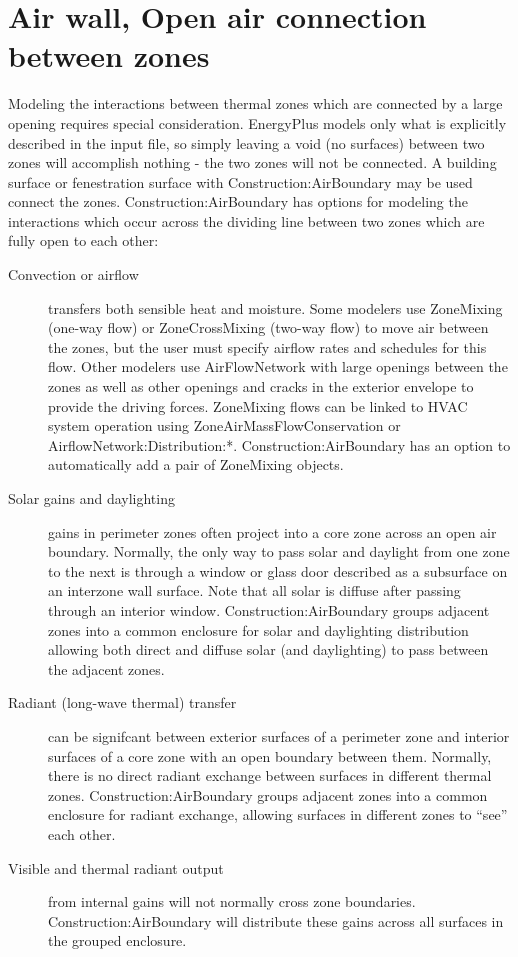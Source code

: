\section{Air wall, Open air connection between zones}\label{air-wall-open-air-connection-between-zones}

Modeling the interactions between thermal zones which are connected by a large opening requires special consideration. EnergyPlus models only what is explicitly described in the input file, so simply leaving a void (no surfaces) between two zones will accomplish nothing - the two zones will not be connected. A building surface or fenestration surface with Construction:AirBoundary may be used connect the zones. Construction:AirBoundary has options for modeling the interactions which occur across the dividing line between two zones which are fully open to each other:

\begin{description}
  \item[Convection or airflow] transfers both sensible heat and moisture. Some modelers use ZoneMixing (one-way flow) or ZoneCrossMixing (two-way flow) to move air between the zones, but the user must specify airflow rates and schedules for this flow. Other modelers use AirFlowNetwork with large openings between the zones as well as other openings and cracks in the exterior envelope to provide the driving forces. ZoneMixing flows can be linked to HVAC system operation using ZoneAirMassFlowConservation or AirflowNetwork:Distribution:*. Construction:AirBoundary has an option to automatically add a pair of ZoneMixing objects.

  \item[Solar gains and daylighting] gains in perimeter zones often project into a core zone across an open air boundary. Normally, the only way to pass solar and daylight from one zone to the next is through a window or glass door described as a subsurface on an interzone wall surface. Note that all solar is diffuse after passing through an interior window. Construction:AirBoundary groups adjacent zones into a common enclosure for solar and daylighting distribution allowing both direct and diffuse solar (and daylighting) to pass between the adjacent zones.

  \item[Radiant (long-wave thermal) transfer] can be signifcant between exterior surfaces of a perimeter zone and interior surfaces of a core zone with an open boundary between them. Normally, there is no direct radiant exchange between surfaces in different thermal zones. Construction:AirBoundary groups adjacent zones into a common enclosure for radiant exchange, allowing surfaces in different zones to ``see'' each other.

  \item[Visible and thermal radiant output] from internal gains will not normally cross zone boundaries. Construction:AirBoundary will distribute these gains across all surfaces in the grouped enclosure.
\end{description}

